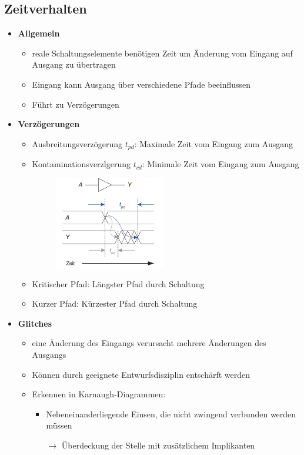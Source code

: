 \documentclass[11pt,a4paper]{article}
\begin{document}
\subsection{Zeitverhalten}
\begin{itemize}

\item \textbf{Allgemein}
	\begin{itemize}
	\item reale Schaltungselemente benötigen Zeit um Änderung vom Eingang auf Ausgang zu übertragen
	\item Eingang kann Ausgang über verschiedene Pfade beeinflussen
	\item Führt zu Verzögerungen
	\end{itemize}
	
\item \textbf{Verzögerungen}
	\begin{itemize}
	\item Ausbreitungsverzögerung $t_{pd}$: Maximale Zeit vom Eingang zum Ausgang
	\item Kontaminationsverzlgerung $t_{cd}$: Minimale Zeit vom Eingang zum Ausgang
	\item[] \begin{figure}[H]
				\begin{center}
				\includegraphics[height=4cm]{delays1}
				\end{center}
			\end{figure}
	\item Kritischer Pfad: Längster Pfad durch Schaltung
	\item Kurzer Pfad: Kürzester Pfad durch Schaltung	
	\end{itemize}

\item \textbf{Glitches}
	\begin{itemize}
	\item eine Änderung des Eingangs verursacht mehrere Änderungen des Ausgangs
	\item Können durch geeignete Entwurfsdisziplin entschärft werden
	\item Erkennen in Karnaugh-Diagrammen:
		\begin{itemize}
		\item Nebeneinanderliegende Einsen, die nicht zwingend verbunden werden müssen
		\item[$\rightarrow$] Überdeckung der Stelle mit zusätzlichem Implikanten
		\end{itemize}
	\end{itemize}

\end{itemize}
\end{document}
